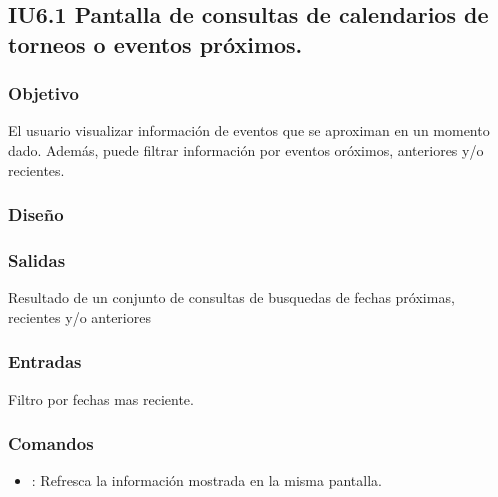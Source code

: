 
\subsection{IU6.1 Pantalla de consultas de calendarios de torneos o eventos próximos.}

\subsubsection{Objetivo}
	El usuario visualizar información de eventos que se aproximan en un momento dado. Además, puede filtrar información por eventos oróximos, anteriores y/o recientes.

\subsubsection{Diseño}


\subsubsection{Salidas}

	Resultado de un conjunto de consultas de busquedas de fechas próximas, recientes y/o anteriores

\subsubsection{Entradas}
	Filtro por fechas mas reciente.

\subsubsection{Comandos}
\begin{itemize}
	\item {}: Refresca la información mostrada en la misma pantalla.
\end{itemize}


